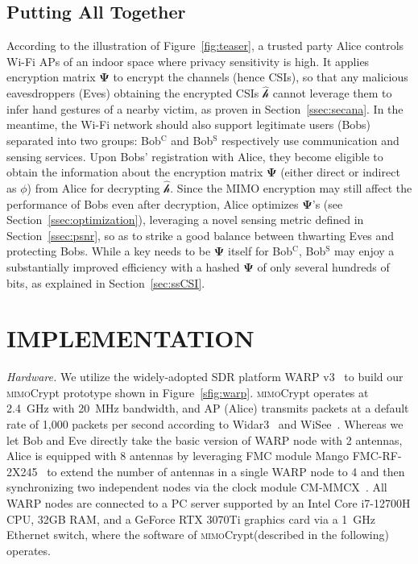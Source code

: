 \documentclass[conference,compsoc]{IEEEtran}
\newcommand{\sname}{\textsc{mimo}Crypt\xspace}
\newcommand{\newrev}[1]{{\color{blue}#1}}    %
\newcommand{\newrev}[1]{#1}
\begin{document}
\subsection{Putting All Together} \label{ssec:together}
%
\vspace{-1ex}
According to 
the illustration of Figure~\ref{fig:teaser}, a trusted party Alice controls Wi-Fi APs of an indoor space where privacy sensitivity is high. It applies encryption matrix $\bm{\Psi}$ to encrypt the channels (hence CSIs), so that any malicious eavesdroppers (Eves) obtaining the encrypted CSIs $\hat{\bm{\mathcal{h}}}$ cannot leverage them to infer hand gestures of a nearby victim, as proven in Section~\ref{ssec:secana}. In the meantime, the Wi-Fi network should also support legitimate users (Bobs) separated into two groups: Bob$^{\mathrm{C}}$ and Bob$^{\mathrm{S}}$ respectively use communication and sensing services. Upon Bobs' registration with Alice, they become eligible to obtain the information about the encryption matrix $\bm{\Psi}$ (either direct or indirect as $\phi$)
from Alice 
for decrypting $\hat{\bm{\mathcal{h}}}$. 
%
Since the MIMO encryption may still affect the performance of Bobs even after decryption, Alice optimizes $\bm{\Psi}$'s (see Section~\ref{ssec:optimization}), leveraging a novel sensing metric defined in Section~\ref{ssec:psnr}, so as to strike a good balance between thwarting Eves and protecting Bobs.
\newrev{
While a key needs to be $\bm{\Psi}$ itself for Bob$^{\mathrm{C}}$, Bob$^{\mathrm{S}}$ may enjoy a substantially improved efficiency with a hashed $\bm{\Psi}$ of only several hundreds of bits, as explained in Section~\ref{sec:ssCSI}.
}


\section{\MakeUppercase{Implementation}}\label{sec:imple}
%
\emph{Hardware.} 
%
We utilize the widely-adopted SDR platform WARP v3~\cite{WARP-web} to build our \sname prototype shown in Figure~\ref{sfig:warp}.  
\sname operates at 2.4\!~GHz with 20\!~MHz bandwidth, and AP (Alice) transmits packets
at a default rate of 1,000 packets per second according to Widar3~\cite{Widar3-MobiSys19} and WiSee~\cite{WiSee-MobiCom13}.
Whereas we let Bob and Eve directly take the basic version of WARP node with 2 antennas, Alice is equipped with 8 antennas by leveraging FMC module Mango FMC-RF-2X245~\cite{fmc} to extend the number of antennas in a single WARP node to 4 and then synchronizing two independent nodes via the clock module CM-MMCX~\cite{mmcx}. All WARP nodes are connected to a PC server supported by an Intel Core i7-12700H CPU, 32GB RAM, and a GeForce RTX 3070Ti graphics card via a 1\!~GHz Ethernet switch, where the software of \sname (described in the following) operates. 
 
\end{document}
